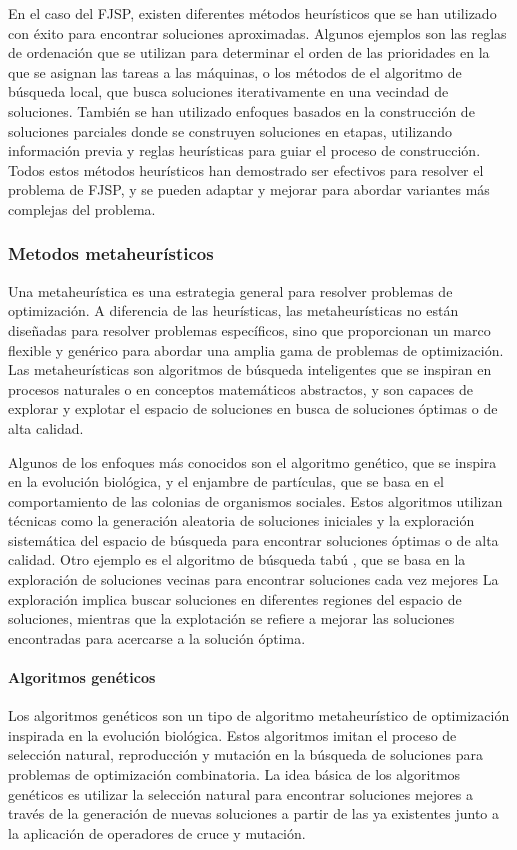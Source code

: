En el caso del FJSP, existen diferentes métodos heurísticos que se han
utilizado con éxito para encontrar soluciones aproximadas. Algunos ejemplos son
las reglas de ordenación que se utilizan para determinar el orden de las
prioridades en la que se asignan las tareas a las máquinas, o los métodos de
el algoritmo de búsqueda local, que busca soluciones iterativamente en una
vecindad de soluciones. También se han utilizado enfoques basados en la
construcción de soluciones parciales donde se construyen soluciones en etapas,
utilizando información previa y reglas heurísticas para guiar el proceso de
construcción. Todos estos métodos heurísticos han demostrado ser efectivos para
resolver el problema de FJSP, y se pueden adaptar y mejorar para abordar
variantes más complejas del problema.

\subsubsection{Metodos metaheurísticos}
Una metaheurística\cite{Metaheuristic_2023} es una estrategia general para
resolver problemas de optimización. A diferencia de las heurísticas, las
metaheurísticas no están diseñadas para resolver problemas específicos, sino
que proporcionan un marco flexible y genérico para abordar una amplia gama de
problemas de optimización. Las metaheurísticas son algoritmos de búsqueda
inteligentes que se inspiran en procesos naturales o en conceptos matemáticos
abstractos, y son capaces de explorar y explotar el espacio de soluciones en
busca de soluciones óptimas o de alta calidad.\medskip

Algunos de los enfoques más conocidos son el algoritmo genético, que se inspira
en la evolución biológica, y el enjambre de partículas, que se basa en el
comportamiento de las colonias de organismos sociales. Estos algoritmos
utilizan técnicas como la generación aleatoria de soluciones iniciales y la
exploración sistemática del espacio de búsqueda para encontrar soluciones
óptimas o de alta calidad. Otro ejemplo es el algoritmo de búsqueda tabú 
\cite{Howell_2023}, que se basa en la exploración de soluciones vecinas para 
encontrar soluciones cada vez mejores La exploración implica buscar soluciones en
diferentes regiones del espacio de soluciones, mientras que la explotación se
refiere a mejorar las soluciones encontradas para acercarse a la solución
óptima.

\paragraph{Algoritmos genéticos}
Los algoritmos genéticos \cite{GeneticAlgorithm_2023} son un tipo de 
algoritmo metaheurístico de optimización inspirada en la evolución biológica. 
Estos algoritmos imitan el proceso de selección natural, reproducción y mutación en la búsqueda de
soluciones para problemas de optimización combinatoria. La idea básica de los
algoritmos genéticos es utilizar la selección natural para encontrar soluciones
mejores a través de la generación de nuevas soluciones a partir de las ya
existentes junto a la aplicación de operadores de cruce y mutación.\medskip

